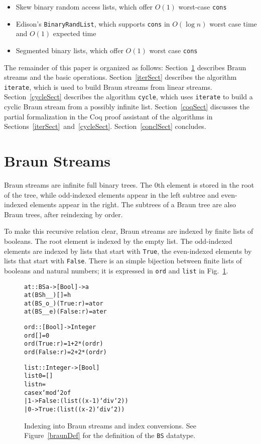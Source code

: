 \documentclass[envcountsect]{llncs}
\begin{document}
\begin{itemize}
\item Skew binary random access lists, which offer $O(1)$ worst-case {\tt cons} \cite{okasakiSkewLists}
\item Edison's \verb|BinaryRandList|, which supports {\tt cons} in $O(\log n)$ worst case time and $O(1)$ expected time \cite{edison,holtersThesis}
\item Segmented binary lists, which offer $O(1)$ worst case {\tt cons} \cite{okasakiThesis}
\end{itemize}


The remainder of this paper is organized as follows: 
Section~\ref{braunSect} describes Braun streams and the basic operations.
Section~\ref{iterSect} describes the algorithm {\tt iterate}, which is used to build Braun streams from linear streams.
Section~\ref{cycleSect} describes the algorithm {\tt cycle}, which uses {\tt iterate} to build a cyclic Braun stream from a possibly infinite list.
Section~\ref{coqSect} discusses the partial formalization in the Coq proof assistant of the algorithms in Sections~\ref{iterSect}~and~\ref{cycleSect}.
Section~\ref{conclSect} concludes.

\section{Braun Streams}
\label{braunSect}

Braun streams are infinite full binary trees.
The $0$th element is stored in the root of the tree, while odd-indexed elements appear in the left subtree and even-indexed elements appear in the right.
The subtrees of a Braun tree are also Braun trees, after reindexing by order.

To make this recursive relation clear, Braun streams are indexed by finite lists of booleans.
The root element is indexed by the empty list.
The odd-indexed elements are indexed by lists that start with \verb|True|, the even-indexed elements by lists that start with \verb|False|.
There is an simple bijection between finite lists of booleans and natural numbers;
it is expressed in \verb|ord| and \verb|list| in Fig.~\ref{basicCode}.

\begin{figure}
\begin{alltt}
at :: BS a -> [Bool] -> a
at (BS h _ _) [] = h
at (BS _ o _) (True:r) = at o r
at (BS _ _ e) (False:r) = at e r

ord :: [Bool] -> Integer
ord [] = 0
ord (True:r) = 1 + 2*(ord r)
ord (False:r) = 2 + 2*(ord r)

list :: Integer -> [Bool]
list 0 = []
list n = 
    case x `mod` 2 of
      | 1 -> False:(list ((x-1)`div`2))
      | 0 -> True:(list ((x-2)`div`2))
\end{alltt}
\caption{Indexing into Braun streams and index conversions.
See Figure~\ref{braunDef} for the definition of the {\tt BS} datatype.}
\label{basicCode}
\end{figure}
\end{document}
